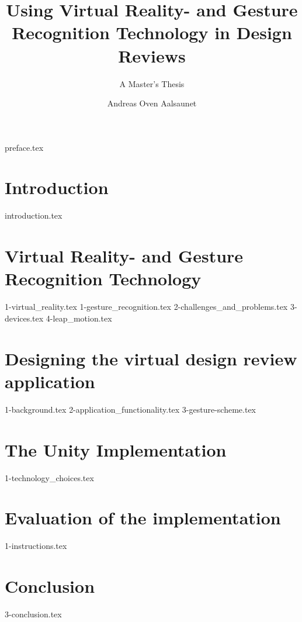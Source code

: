 \documentclass[UKenglish]{ifimaster}
\title{Using Virtual Reality- and Gesture Recognition Technology in Design Reviews}
\subtitle{A Master's Thesis}
\author{Andreas Oven Aalsaunet}
\begin{document}
\duoforside[dept={Department of Informatics}, program={Programming and Networks}, long]                                        

{preface.tex}

\frontmatter{}                 
\tableofcontents{}
\listoffigures{}
\listoftables{}

\mainmatter{}
\chapter{Introduction}  
{introduction.tex}

\chapter{Virtual Reality- and Gesture Recognition Technology}
{1-virtual_reality.tex}
{1-gesture_recognition.tex}
{2-challenges_and_problems.tex}
{3-devices.tex}
{4-leap_motion.tex}



\chapter{Designing the virtual design review application}
{1-background.tex}
{2-application_functionality.tex}
{3-gesture-scheme.tex}

\chapter{The Unity Implementation}
{1-technology_choices.tex}

\chapter{Evaluation of the implementation}
{1-instructions.tex}

\chapter{Conclusion}
{3-conclusion.tex}

\backmatter{}


\end{document}

